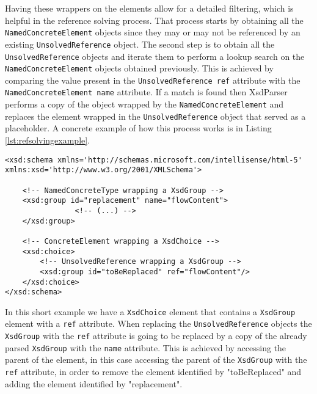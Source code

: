 \noindent
Having these wrappers on the elements allow for a detailed filtering, which is helpful in the reference solving process. That process starts by obtaining all the \texttt{NamedConcreteElement} objects since they may or may not be referenced by an existing \texttt{UnsolvedReference} object. The second step is to obtain all the \texttt{UnsolvedReference} objects and iterate them to perform a lookup search on the \texttt{NamedConcreteElement} objects obtained previously. This is achieved by comparing the value present in the \texttt{UnsolvedReference ref} attribute with the \texttt{NamedConcreteElement name} attribute. If a match is found then XsdParser performs a copy of the object wrapped by the \texttt{NamedConcreteElement} and replaces the element wrapped in the \texttt{UnsolvedReference} object that served as a placeholder. A concrete example of how this process works is in Listing \ref{lst:refsolvingexample}.

\bigskip


\begin{minipage}{\linewidth}
\begin{lstlisting}[caption={Reference Solving Example},captionpos=b,label={lst:refsolvingexample}]
<xsd:schema xmlns='http://schemas.microsoft.com/intellisense/html-5' xmlns:xsd='http://www.w3.org/2001/XMLSchema'>
	
    <!-- NamedConcreteType wrapping a XsdGroup -->
    <xsd:group id="replacement" name="flowContent">
				<!-- (...) -->
    </xsd:group>
	
    <!-- ConcreteElement wrapping a XsdChoice -->
    <xsd:choice>
        <!-- UnsolvedReference wrapping a XsdGroup -->
        <xsd:group id="toBeReplaced" ref="flowContent"/>
    </xsd:choice>
</xsd:schema>
\end{lstlisting}
\end{minipage}

\noindent
In this short example we have a \texttt{XsdChoice} element that contains a \texttt{XsdGroup} element with a \texttt{ref} attribute. When replacing the \texttt{UnsolvedReference} objects the \texttt{XsdGroup} with the \texttt{ref} attribute is going to be replaced by a copy of the already parsed \texttt{XsdGroup} with the \texttt{name} attribute. This is achieved by accessing the parent of the element, in this case accessing the parent of the \texttt{XsdGroup} with the \texttt{ref} attribute, in order to remove the element identified by "toBeReplaced" and adding the element identified by "replacement".

